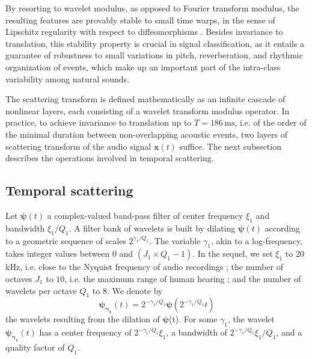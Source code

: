 \documentclass[journal]{IEEEtran}
\makeatletter
\newcommand*{\ie}{i.e.\@\xspace}
\makeatother
\begin{document}
By resorting to wavelet modulus, as opposed to Fourier transform modulus, the resulting features are provably stable to small time warps,
in the sense of Lipschitz regularity with respect to diffeomorphisms \cite{Mallat2012}.
Besides invariance to translation, this stability property is crucial in signal classification, as it entails a guarantee of robustness to small variations in pitch, reverberation, and rhythmic organization of events, which make up an important part of the intra-class variability among natural sounds.

The scattering transform is defined mathematically as an infinite cascade of nonlinear layers, each consisting of a wavelet transform modulus operator.
In practice, to achieve invariance to translation up to $T = 186\,\mathrm{ms}$, \ie of the order of the minimal duration between non-overlapping acoustic events, two layers of scattering transform of the audio signal $\boldsymbol{x}(t)$ suffice.
The next subsection describes the operations involved in temporal scattering.

\subsection{Temporal scattering}
Let $\boldsymbol{\psi}(t)$ a complex-valued band-pass filter of
center frequency $\xi_1$ and bandwidth $\xi_1/Q_1$.
A filter bank of wavelets is built by dilating $\boldsymbol{\psi}(t)$
according to a geometric sequence of scales $2^{\gamma_1/Q_1}$.
The variable $\gamma_1$, akin to a log-frequency, takes integer values between $0$ and $(J_1 \times Q_1 - 1)$.
In the sequel, we set $\xi_1$ to 20 kHz, \ie close to the Nyquist frequency of audio recordings ; the number of octaves $J_1$ to $10$, \ie the maximum range of human hearing ; and the number of wavelets per octave $Q_1$ to $8$.
We denote by
\begin{equation}
\boldsymbol{\psi_{\gamma_1}}(t) = 2^{-\gamma_1/Q_1} \boldsymbol{\psi}(2^{-\gamma_1/Q_1} t)
\end{equation}
the wavelets resulting from the dilation of $\boldsymbol{\psi}$(t).
For some $\gamma_1$, the wavelet $\boldsymbol{\psi_{\gamma_1}}(t)$
has a center frequency of $2^{-\gamma_1/Q_1}\xi_1$, a bandwidth of $2^{-\gamma_1/Q_1}\xi_1/Q_1$, and a quality factor of $Q_1$.
\end{document}
